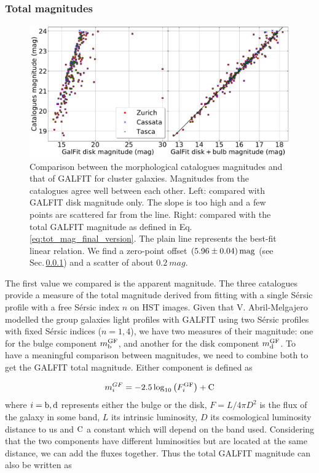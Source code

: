 \subsubsection{Total magnitudes}
\label{sec:tot_mag}

\begin{figure}[htbp]
	\includegraphics[width=\linewidth]{../Plots/catalogMag_against_GalfitMag_corrected.pdf}
	\caption[Comparison between GALFIT and catalogues magnitudes]{Comparison between the morphological catalogues magnitudes and that of GALFIT for cluster galaxies. Magnitudes from the catalogues agree well between each other. Left: compared with GALFIT disk magnitude only. The slope is too high and a few points are scattered far from the line. Right: compared with the total GALFIT magnitude as defined in Eq.\,\ref{eq:tot_mag_final_version}. The plain line represents the best-fit linear relation. We find a zero-point offset $(5.96 \pm 0.04)\, \rm{mag}$ (see Sec.\,\ref{sec:tot_mag}) and a scatter of about $\SI{0.2}{mag}$.}
	\label{fig:comp_mags}
\end{figure}

The first value we compared is the apparent magnitude. The three catalogues provide a measure of the total magnitude derived from fitting with a single Sérsic profile with a free Sérsic index $n$ on HST images. Given that V. Abril-Melgajero  modelled the group galaxies light profiles with GALFIT using two Sérsic profiles with fixed Sérsic indices ($n = 1, 4$), we have two measures of their magnitude: one for the bulge component $m_{\rm{b}}^{\rm{GF}}$, and another for the disk component $m_{\rm{d}}^{\rm{GF}}$. To have a meaningful comparison between magnitudes, we need to combine both to get the GALFIT total magnitude. Either component is defined as

\begin{equation}
	m_i^{GF} = -2.5 \log_{10} \left ( F_i^{\rm{GF}} \right ) + \rm{C}
	\label{eq:disk_bulge_lum}
\end{equation}
 where $i = \rm{b, d}$ represents either the bulge or the disk, $F = L/{4 \pi D^2}$ is the flux of the galaxy in some band, $L$ its intrinsic luminosity, $D$ its cosmological luminosity distance to us and $\rm{C}$ a constant which will depend on the band used. Considering that the two components have different luminosities but are located at the same distance, we can add the fluxes together. Thus the total GALFIT magnitude can also be written as

